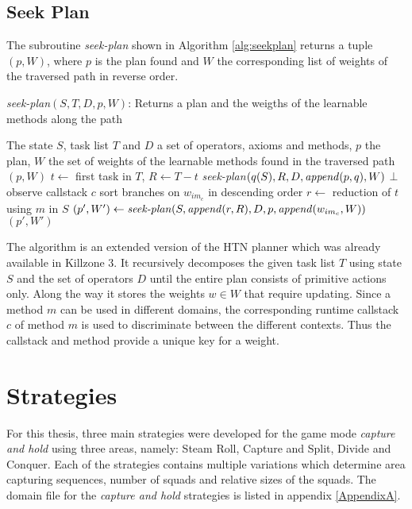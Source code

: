 \subsection{Seek Plan}
The subroutine \emph{seek-plan} shown in Algorithm \ref{alg:seekplan} returns a
tuple $(p,W)$, where $p$ is the plan found and $W$ the corresponding list of
weights of the traversed path in reverse order.
\begin{algorithm}
	\caption{\emph{seek-plan}$(S,T,D,p,W)$: Returns a plan and the weigths of the learnable methods along the path}
	\begin{algorithmic}[1]
	\REQUIRE The state $S$, task list $T$ and $D$ a set of operators, axioms and methods, $p$ the plan, $W$ the set of weights of the learnable methods found in the traversed path
	\medskip
		\RETURN $(p,W)$
	\ENDIF
	\STATE $t \leftarrow$ first task in $T$, $R \leftarrow T - t$
			\RETURN \emph{seek-plan}$(q(S),R,D,\textrm{\emph{append}}(p,q),W)$
		\ELSE
			\RETURN $\bot$
		\ENDIF
	\ELSE
		\STATE observe callstack $c$
			\STATE sort branches on $w_{im_c}$ in descending order
		\ENDIF
		\STATE $r \leftarrow$ reduction of $t$ using $m$ in $S$
		\STATE $(p', W') \leftarrow \textrm{\emph{seek-plan}}(S, \textrm{\emph{append}}(r,R),D,p,\textrm{\emph{append}}(w_{im_c},W))$
			\RETURN $(p', W')$
		\ENDIF
		\ENDFOR
	\ENDIF
	\end{algorithmic}
\label{alg:seekplan}
\end{algorithm}
The algorithm is an extended version of the HTN planner which was already
available in Killzone 3. It recursively decomposes the given task list $T$
using state $S$ and the set of operators $D$ until the entire plan consists of
primitive actions only. Along the way it stores the weights $w \in W$ that
require updating. Since a method $m$ can be used in different domains, the
corresponding runtime callstack $c$ of method $m$ is used to discriminate
between the different contexts. Thus the callstack and method provide a unique
key for a weight.

\section{Strategies}
For this thesis, three main strategies were developed for the game mode
\emph{capture and hold} using three areas, namely: Steam Roll, Capture and
Split, Divide and Conquer. Each of the strategies contains multiple variations
which determine area capturing sequences, number of squads and relative sizes
of the squads. The domain file for the \emph{capture and hold} strategies is
listed in appendix \ref{AppendixA}.
